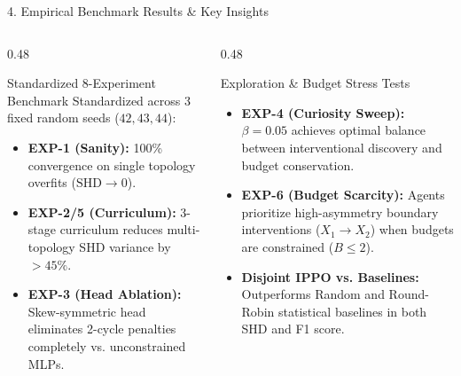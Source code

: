 \documentclass[aspectratio=169, 10pt]{beamer}
\begin{document}
\begin{frame}{4. Empirical Benchmark Results \& Key Insights}
  \begin{columns}[T]
    \begin{column}{0.48\textwidth}
      \begin{block}{Standardized 8-Experiment Benchmark}
        Standardized across 3 fixed random seeds ($42, 43, 44$):
        \begin{itemize}
          \item \textbf{EXP-1 (Sanity):} 100\% convergence on single topology overfits ($\text{SHD} \to 0$).
          \item \textbf{EXP-2/5 (Curriculum):} 3-stage curriculum reduces multi-topology SHD variance by $>45\%$.
          \item \textbf{EXP-3 (Head Ablation):} Skew-symmetric head eliminates 2-cycle penalties completely vs. unconstrained MLPs.
        \end{itemize}
      \end{block}
    \end{column}

    \begin{column}{0.48\textwidth}
      \begin{block}{Exploration \& Budget Stress Tests}
        \begin{itemize}
          \item \textbf{EXP-4 (Curiosity Sweep):} $\beta = 0.05$ achieves optimal balance between interventional discovery and budget conservation.
          \item \textbf{EXP-6 (Budget Scarcity):} Agents prioritize high-asymmetry boundary interventions ($X_1 \to X_2$) when budgets are constrained ($B \le 2$).
          \item \textbf{Disjoint IPPO vs. Baselines:} Outperforms Random and Round-Robin statistical baselines in both SHD and F1 score.
        \end{itemize}
      \end{block}
    \end{column}
  \end{columns}
\end{frame}
\end{document}
